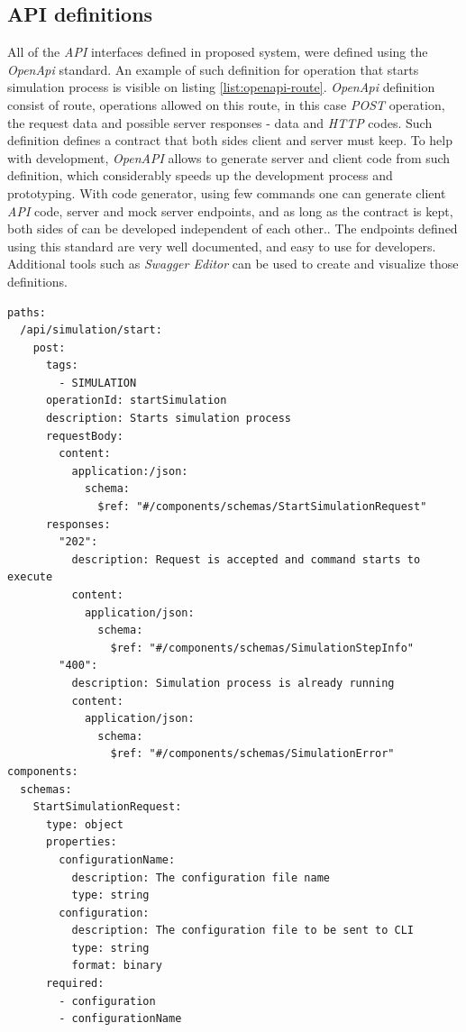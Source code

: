 \subsection{API definitions}
All of the \textit{API} interfaces defined in proposed system, were defined using the \textit{OpenApi} standard. An example of such definition for operation that starts simulation process is visible on listing \ref{list:openapi-route}. \textit{OpenApi} definition consist of route, operations allowed on this route, in this case \textit{POST} operation, the request data and possible server responses - data and \textit{HTTP} codes. Such definition defines a contract that both sides client and server must keep. To help with development, \textit{OpenAPI} allows to generate server and client code from such definition, which considerably speeds up the development process and prototyping. With code generator, using few commands one can generate client \textit{API} code, server and mock server endpoints, and as long as the contract is kept, both sides of can be developed independent of each other.. The endpoints defined using this standard are very well documented, and easy to use for developers. Additional tools such as \textit{Swagger Editor} can be used to create and visualize those definitions. 
\begin{lstlisting}[label=list:openapi-route,caption=The OpenAPI route definition for simulation start, basicstyle=\footnotesize\ttfamily]
paths:
  /api/simulation/start:
    post:
      tags:
        - SIMULATION
      operationId: startSimulation
      description: Starts simulation process
      requestBody:
        content:
          application:/json:
            schema:
              $ref: "#/components/schemas/StartSimulationRequest"
      responses:
        "202":
          description: Request is accepted and command starts to execute
          content:
            application/json:
              schema:
                $ref: "#/components/schemas/SimulationStepInfo"
        "400":
          description: Simulation process is already running
          content:
            application/json:
              schema:
                $ref: "#/components/schemas/SimulationError"
components:
  schemas:
    StartSimulationRequest:
      type: object
      properties:
        configurationName:
          description: The configuration file name
          type: string
        configuration:
          description: The configuration file to be sent to CLI
          type: string
          format: binary
      required:
        - configuration
        - configurationName
\end{lstlisting}
